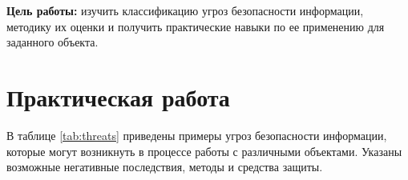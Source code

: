 \documentclass{bsuir}
\begin{document}
\maketitle
\mainmatter

\textbf{Цель работы:} изучить классификацию угроз безопасности информации, методику их оценки и получить практические
навыки по ее применению для заданного объекта.

\section{Практическая работа}

В таблице \ref{tab:threats} приведены примеры угроз безопасности информации, которые могут возникнуть в процессе работы
с различными объектами. Указаны возможные негативные последствия, методы и средства защиты.
\end{document}
